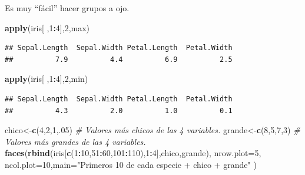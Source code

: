 \documentclass[
]{book}
\newenvironment{Shaded}{\begin{snugshade}}{\end{snugshade}}
\newcommand{\AttributeTok}[1]{\textcolor[rgb]{0.13,0.29,0.53}{#1}}
\newcommand{\CommentTok}[1]{\textcolor[rgb]{0.56,0.35,0.01}{\textit{#1}}}
\newcommand{\DecValTok}[1]{\textcolor[rgb]{0.00,0.00,0.81}{#1}}
\newcommand{\FunctionTok}[1]{\textcolor[rgb]{0.13,0.29,0.53}{\textbf{#1}}}
\newcommand{\NormalTok}[1]{#1}
\newcommand{\OtherTok}[1]{\textcolor[rgb]{0.56,0.35,0.01}{#1}}
\newcommand{\SpecialCharTok}[1]{\textcolor[rgb]{0.81,0.36,0.00}{\textbf{#1}}}
\newcommand{\StringTok}[1]{\textcolor[rgb]{0.31,0.60,0.02}{#1}}
\begin{document}
Es muy ``fácil'' hacer grupos a ojo.

\begin{Shaded}
\begin{Highlighting}[]
\FunctionTok{apply}\NormalTok{(iris[ ,}\DecValTok{1}\SpecialCharTok{:}\DecValTok{4}\NormalTok{],}\DecValTok{2}\NormalTok{,max)}
\end{Highlighting}
\end{Shaded}

\begin{verbatim}
## Sepal.Length  Sepal.Width Petal.Length  Petal.Width 
##          7.9          4.4          6.9          2.5
\end{verbatim}

\begin{Shaded}
\begin{Highlighting}[]
\FunctionTok{apply}\NormalTok{(iris[ ,}\DecValTok{1}\SpecialCharTok{:}\DecValTok{4}\NormalTok{],}\DecValTok{2}\NormalTok{,min)}
\end{Highlighting}
\end{Shaded}

\begin{verbatim}
## Sepal.Length  Sepal.Width Petal.Length  Petal.Width 
##          4.3          2.0          1.0          0.1
\end{verbatim}

\begin{Shaded}
\begin{Highlighting}[]
\NormalTok{chico}\OtherTok{\textless{}{-}}\FunctionTok{c}\NormalTok{(}\DecValTok{4}\NormalTok{,}\DecValTok{2}\NormalTok{,}\DecValTok{1}\NormalTok{,.}\DecValTok{05}\NormalTok{) }\CommentTok{\# Valores más chicos de las 4 variables.}
\NormalTok{grande}\OtherTok{\textless{}{-}}\FunctionTok{c}\NormalTok{(}\DecValTok{8}\NormalTok{,}\DecValTok{5}\NormalTok{,}\DecValTok{7}\NormalTok{,}\DecValTok{3}\NormalTok{) }\CommentTok{\# Valores más grandes de las 4 variables.}
\FunctionTok{faces}\NormalTok{(}\FunctionTok{rbind}\NormalTok{(iris[}\FunctionTok{c}\NormalTok{(}\DecValTok{1}\SpecialCharTok{:}\DecValTok{10}\NormalTok{,}\DecValTok{51}\SpecialCharTok{:}\DecValTok{60}\NormalTok{,}\DecValTok{101}\SpecialCharTok{:}\DecValTok{110}\NormalTok{),}\DecValTok{1}\SpecialCharTok{:}\DecValTok{4}\NormalTok{],chico,grande), }\AttributeTok{nrow.plot=}\DecValTok{5}\NormalTok{, }\AttributeTok{ncol.plot=}\DecValTok{10}\NormalTok{,}\AttributeTok{main=}\StringTok{"Primeros 10 de cada especie + chico + grande"}\NormalTok{ )}
\end{Highlighting}
\end{Shaded}
\end{document}

